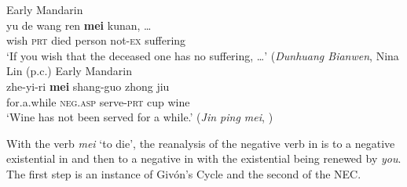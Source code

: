 ﻿\documentclass[output=paper]{langsci/langscibook}
\begin{document}
\begin{exe}\ex Early Mandarin \label{ex:other-mandarin-suffer}\\
    \gll yu  de  wang  ren  \textbf{mei}    kunan, \ldots{}    \\
wish  \textsc{prt}  died  person  not-\textsc{ex}   suffering \\
    \glt `If you wish that the deceased one has no suffering, \ldots' 
  (\textit{Dunhuang Bianwen}, Nina Lin (p.c.)
    \ex Early Mandarin \label{ex:other-mandarin-wine}\\
    \gll zhe-yi-ri    \textbf{mei}    shang-guo  zhong  jiu \\
  for.a.while  \textsc{neg.asp}  serve-\textsc{prt}  cup  wine \\
    \glt `Wine has not been served for a while.' (\textit{Jin ping mei},
    \citealt[200]{Shi2002}) 
    \end{exe} 
%
With the verb \textit{mei} `to die', the reanalysis of the negative verb in
 is to a negative existential in
 and then to a negative in
 with the existential being renewed by
\textit{you}. The first step is an instance of Givón's Cycle and the second
of the NEC. 
\end{document}

